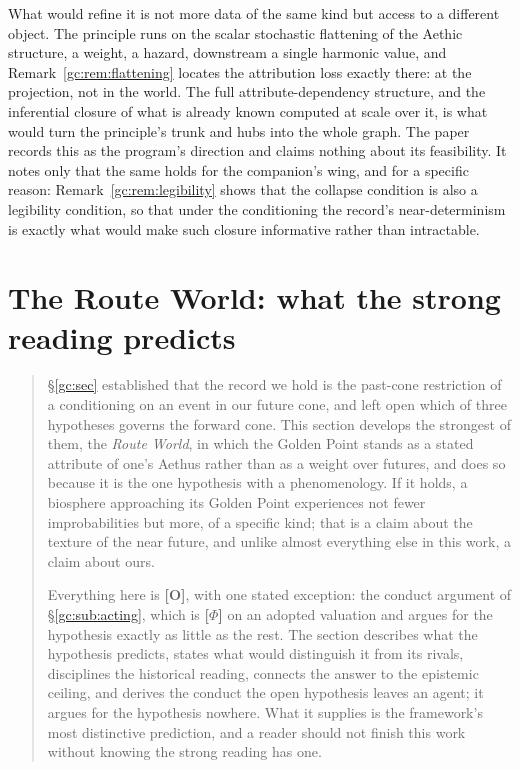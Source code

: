 \documentclass[11pt]{article}
\numberwithin{equation}{section}
\theoremstyle{plain}
\theoremstyle{definition}
\theoremstyle{remark}
\begin{document}
What would refine it is not more data of the same kind but access to a
different object. The principle runs on the scalar stochastic flattening
of the Aethic structure, a weight, a hazard, downstream a single
harmonic value, and Remark~\ref{gc:rem:flattening} locates the
attribution loss exactly there: at the projection, not in the world. The
full attribute-dependency structure, and the inferential closure of what
is already known computed at scale over it, is what would turn the
principle's trunk and hubs into the whole graph. The paper records this
as the program's direction and claims nothing about its feasibility. It
notes only that the same holds for the companion's wing, and for a
specific reason: Remark~\ref{gc:rem:legibility} shows that the collapse
condition is also a legibility condition, so that under the conditioning
the record's near-determinism is exactly what would make such closure
informative rather than intractable.

\section{The Route World: what the strong reading predicts}\label{gc:subsub:routeworld}\label{rw:sec}

\begin{quote}\small
\S\ref{gc:sec} established that the record we hold is the past-cone
restriction of a conditioning on an event in our future cone, and left
open which of three hypotheses governs the forward cone. This section
develops the strongest of them, the \emph{Route World}, in which the
Golden Point stands as a stated attribute of one's Aethus rather than as
a weight over futures, and does so because it is the one hypothesis
with a phenomenology. If it holds, a biosphere approaching its Golden
Point experiences not fewer improbabilities but more, of a specific kind;
that is a claim about the texture of the near future, and unlike almost
everything else in this work, a claim about ours.

Everything here is \textbf{[O]}, with one stated exception: the
conduct argument of \S\ref{gc:sub:acting}, which is
\textbf{[$\Phi$]} on an adopted valuation and argues for the
hypothesis exactly as little as the rest. The section describes what
the hypothesis predicts, states what would distinguish it from its
rivals, disciplines the historical reading, connects the answer to the
epistemic ceiling, and derives the conduct the open hypothesis leaves
an agent; it argues for the hypothesis nowhere. What it supplies is the framework's most distinctive
prediction, and a reader should not finish this work without knowing the
strong reading has one.
\end{quote}
\end{document}
